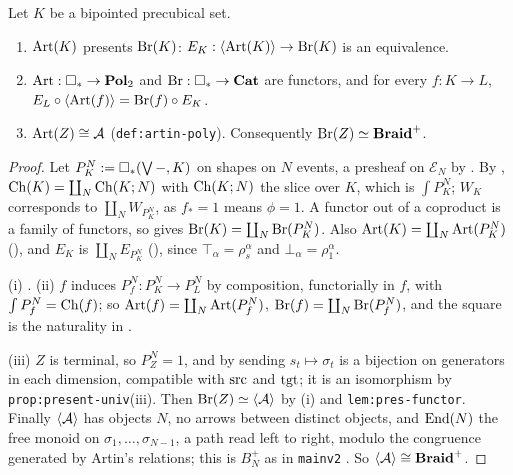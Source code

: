 \documentclass[11pt]{article}
\newcommand{\EN}{\mathcal{E}_N}
\begin{document}
\begin{theorem}\label{thm:main}
  Let $K$ be a bipointed precubical set.
  \begin{enumerate}
    \item $\operatorname{Art}(K)$ presents $\operatorname{Br}(K)$: $E_K : \left\langle \operatorname{Art}(K) \right\rangle \to \operatorname{Br}(K)$ is an equivalence.
    \item $\operatorname{Art} : \square_{*} \to \mathbf{Pol}_2$ and $\operatorname{Br} : \square_{*} \to \mathbf{Cat}$ are functors, and for every $f :
      K \to L$, $E_L \circ \left\langle \operatorname{Art}(f) \right\rangle = \operatorname{Br}(f) \circ E_K$.
    \item $\operatorname{Art}(Z) \cong \mathcal{A}$ (\texttt{def:artin-poly}). Consequently $\operatorname{Br}(Z) \simeq
      \mathbf{Braid}^{+}$.
  \end{enumerate}
\end{theorem}
\begin{proof}
  Let $P^N_K := \square_{*}(\bigvee -, K)$ on shapes on $N$ events, a presheaf on $\EN$ by
  . By \cite[Def.~7.4]{Z2}, $\operatorname{Ch}(K) = \coprod_N \operatorname{Ch}(K;N)$ with $\operatorname{Ch}(K;N)$ the slice
  over $K$, which is $\int P^N_K$; $W_K$ corresponds to $\coprod_N W_{P^N_K}$, as $f_* = 1$ means
  $\phi = 1$. A functor out of a coproduct is a family of functors, so \cite[Lem.~I.1.2]{GZ} gives
  $\operatorname{Br}(K) = \coprod_N \operatorname{Br}(P^N_K)$. Also $\operatorname{Art}(K) = \coprod_N \operatorname{Art}(P^N_K)$ (), and $E_K$
  is $\coprod_N E_{P^N_K}$ (), since $\top_\alpha = \rho^\alpha_s$ and $\bot_\alpha =
  \rho^\alpha_1$.

  (i) . (ii) $f$ induces $P^N_f : P^N_K \to P^N_L$ by composition, functorially in $f$,
  with $\int P^N_f = \operatorname{Ch}(f)$; so $\operatorname{Art}(f) = \coprod_N \operatorname{Art}(P^N_f)$, $\operatorname{Br}(f) = \coprod_N
  \operatorname{Br}(P^N_f)$, and the square is the naturality in .

  (iii) $Z$ is terminal, so $P^N_Z = 1$, and by  sending $s_t \mapsto \sigma_t$ is a
  bijection on generators in each dimension, compatible with $\operatorname{src}$ and $\operatorname{tgt}$; it is an
  isomorphism by \texttt{prop:present-univ}(iii). Then $\operatorname{Br}(Z) \simeq \left\langle \mathcal{A} \right\rangle$ by (i) and
  \texttt{lem:pres-functor}. Finally $\left\langle \mathcal{A} \right\rangle$ has objects $N$, no arrows between distinct
  objects, and $\operatorname{End}(N)$ the free monoid on $\sigma_1,\dots,\sigma_{N-1}$, a path read left to right,
  modulo the congruence generated by Artin's relations; this is $B_N^+$ as in \texttt{mainv2}
  \cite{Artin}. So $\left\langle \mathcal{A} \right\rangle \cong \mathbf{Braid}^{+}$.
\end{proof}

\printbibliography
\end{document}
